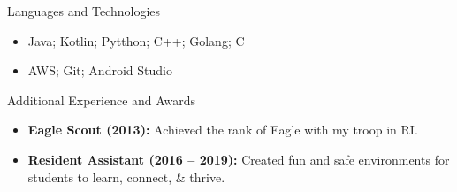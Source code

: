 \documentclass[]{mcdowellcv}
\begin{document}
	\begin{cvsection}{Languages and Technologies}
		\begin{cvsubsection}{}{}{}	
			\begin{itemize}
				\item Java; Kotlin; Pytthon; C++; Golang; C
				\item AWS; Git; Android Studio
			\end{itemize}
		\end{cvsubsection}
	\end{cvsection}

	\begin{cvsection}{Additional Experience and Awards}
		\begin{cvsubsection}{}{}{}	
			\begin{itemize}
				\item \textbf{Eagle Scout (2013):} Achieved the rank of Eagle with my troop in RI.
				\item \textbf{Resident Assistant (2016 -- 2019):} Created fun and safe environments for students to learn, connect, \& thrive.
			\end{itemize}
		\end{cvsubsection}
	\end{cvsection}
		
\end{document}
